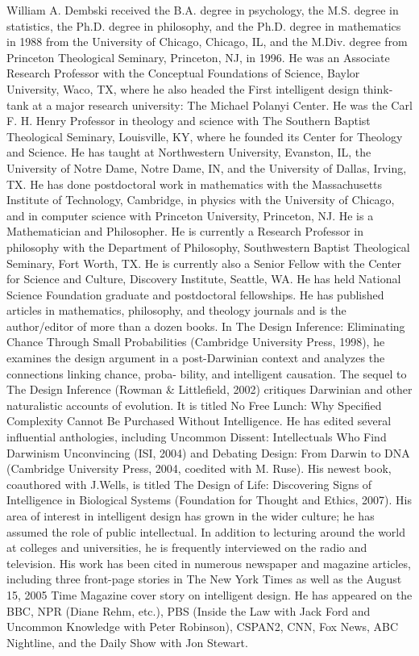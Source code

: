 
William A. Dembski received the B.A. degree in psychology, the M.S. degree in statistics, the
Ph.D. degree in philosophy, and the Ph.D. degree in mathematics in 1988 from the University of
Chicago, Chicago, IL, and the M.Div. degree from Princeton Theological Seminary, Princeton,
NJ, in 1996. He was an Associate Research Professor with the Conceptual Foundations of Science, 
Baylor University, Waco, TX, where he also headed the First intelligent design think-tank
at a major research university: The Michael Polanyi Center. He was the Carl F. H. Henry Professor 
in theology and science with The Southern Baptist Theological Seminary, Louisville, KY,
where he founded its Center for Theology and Science. He has taught at Northwestern University, 
Evanston, IL, the University of Notre Dame, Notre Dame, IN, and the University of Dallas,
Irving, TX. He has done postdoctoral work in mathematics with the Massachusetts Institute of
Technology, Cambridge, in physics with the University of Chicago, and in computer science with
Princeton University, Princeton, NJ. He is a Mathematician and Philosopher. He is currently a
Research Professor in philosophy with the Department of Philosophy, Southwestern Baptist Theological 
Seminary, Fort Worth, TX. He is currently also a Senior Fellow with the Center for Science
and Culture, Discovery Institute, Seattle, WA. He has held National Science Foundation graduate
and postdoctoral fellowships. He has published articles in mathematics, philosophy, and theology
journals and is the author/editor of more than a dozen books. In The Design Inference: Eliminating 
Chance Through Small Probabilities (Cambridge University Press, 1998), he examines the
design argument in a post-Darwinian context and analyzes the connections linking chance, proba-
bility, and intelligent causation. The sequel to The Design Inference (Rowman \& Littlefield, 2002)
critiques Darwinian and other naturalistic accounts of evolution. It is titled No Free Lunch: Why
Specified Complexity Cannot Be Purchased Without Intelligence. He has edited several influential
anthologies, including Uncommon Dissent: Intellectuals Who Find Darwinism Unconvincing (ISI,
2004) and Debating Design: From Darwin to DNA (Cambridge University Press, 2004, coedited
with M. Ruse). His newest book, coauthored with J.Wells, is titled The Design of Life: Discovering
Signs of Intelligence in Biological Systems (Foundation for Thought and Ethics, 2007). His area
of interest in intelligent design has grown in the wider culture; he has assumed the role of public
intellectual. In addition to lecturing around the world at colleges and universities, he is frequently
interviewed on the radio and television. His work has been cited in numerous newspaper and
magazine articles, including three front-page stories in The New York Times as well as the August
15, 2005 Time Magazine cover story on intelligent design. He has appeared on the BBC, NPR
(Diane Rehm, etc.), PBS (Inside the Law with Jack Ford and Uncommon Knowledge with Peter
Robinson), CSPAN2, CNN, Fox News, ABC Nightline, and the Daily Show with Jon Stewart.

